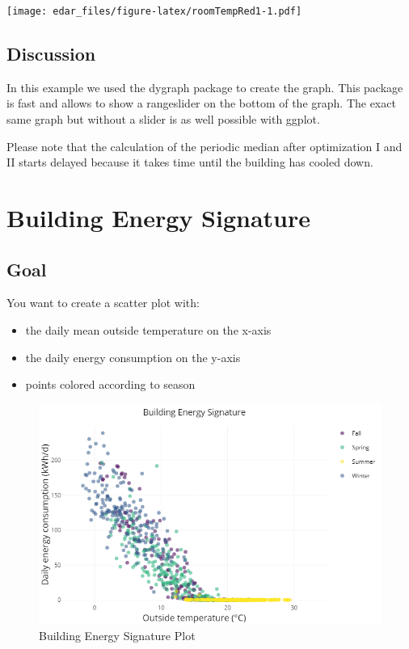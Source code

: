 \documentclass[
  a4paperpaper,
]{book}
\begin{document}
\texttt{[image: edar\_files/figure-latex/roomTempRed1-1.pdf]}

\hypertarget{discussion-7}{%
\subsection{Discussion}\label{discussion-7}}

In this example we used the dygraph package to create the graph. This package is fast and allows to show a rangeslider on the bottom of the graph. The exact same graph but without a slider is as well possible with ggplot.

Please note that the calculation of the periodic median after optimization I and II starts delayed because it takes time until the building has cooled down.

\newpage

\hypertarget{building-energy-signature}{%
\section{Building Energy Signature}\label{building-energy-signature}}

\hypertarget{goal-18}{%
\subsection{Goal}\label{goal-18}}

You want to create a scatter plot with:

\begin{itemize}
\item
  the daily mean outside temperature on the x-axis
\item
  the daily energy consumption on the y-axis
\item
  points colored according to season
\end{itemize}

\begin{figure}
\includegraphics[width=0.7\linewidth]{images/plotBldgEngySigScatter} \caption{Building Energy Signature Plot}\label{fig:unnamed-chunk-28}
\end{figure}
\end{document}
